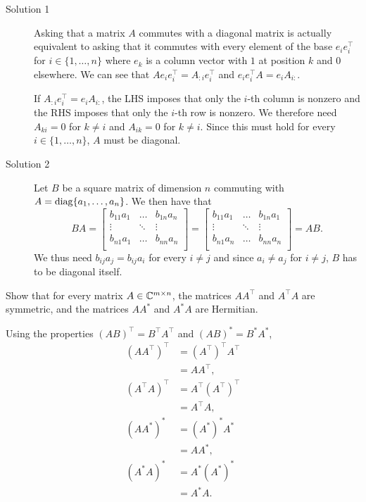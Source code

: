 \begin{solution}
  \begin{description}
    \item[Solution 1]
    Asking that a matrix $A$ commutes with a diagonal matrix is actually equivalent to asking
    that it commutes with every element of the base 
    $e_ie_i^\top$ for $i \in \{1, \ldots, n\}$ where
    $e_k$ is a column vector with \(1\) at position $k$ and \(0\) elsewhere.
    We can see that $Ae_ie_i^\top = A_{:i}e_i^\top$ and $e_ie_i^\top A = e_iA_{i:}$.
  
    If $A_{:i}e_i^\top = e_iA_{i:}$, the LHS imposes that only the $i$-th column is nonzero
    and the RHS imposes that only the $i$-th row is nonzero.
    We therefore need $A_{ki} = 0$ for $k \neq i$ and $A_{ik} = 0$ for $k \neq i$.
    Since this must hold for every $i \in \{1, \ldots, n\}$, $A$ must be diagonal.
   
    \item[Solution 2]
    Let $B$ be a square matrix of dimension $n$ commuting with $A = \operatorname{diag}\{a_1,\dots,a_n\}$.
    We then have that
    \[
      B A =
      \begin{bmatrix}
        b_{11} a_1 & \dots & b_{1n} a_n \\
        \vdots & \ddots & \vdots \\
        b_{n1} a_1 & \dots & b_{nn} a_n \\
      \end{bmatrix}
      =
      \begin{bmatrix}
        b_{11} a_1 & \dots & b_{1n} a_1 \\
        \vdots & \ddots & \vdots \\
        b_{n1} a_n & \dots & b_{nn} a_n \\
      \end{bmatrix}
      = A B.
    \]
    We thus need $b_{ij} a_j = b_{ij} a_i$ for every $i \neq j$
    and since $a_i \neq a_j$ for $i \neq j$, $B$ has to be diagonal itself.
  \end{description}
\end{solution}

Show that for every matrix \(A \in \mathbb{C}^{m \times n}\), the matrices \(AA^\top\) and \(A^\top A\) are symmetric, and the matrices \(AA^*\) and \(A^*A\) are Hermitian.

\begin{solution}
  Using the properties $(AB)^\top = B^\top A^\top$ and $(AB)^* = B^*A^*$,
  \begin{align*}
    (AA^\top)^\top & = (A^\top)^\top A^\top\\
             & = AA^\top,\\
    (A^\top A)^\top & = A^\top(A^\top)^\top\\
             & = A^\top A,\\
    (AA^*)^* & = (A^*)^*A^*\\
             & = AA^*,\\
    (A^*A)^* & = A^*(A^*)^*\\
             & = A^*A.
  \end{align*}
\end{solution}

